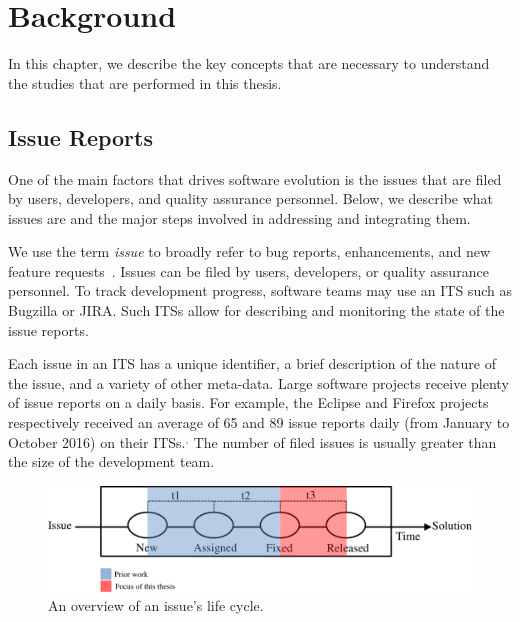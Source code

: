\chapter[Background]{Background} \label{ch:background}

In this chapter, we describe the key concepts that are necessary to understand
the studies that are performed in this thesis.

\section{Issue Reports}

One of the main factors that drives software evolution is the issues that are
filed by users, developers, and quality assurance personnel. Below, we describe
what issues are and the major steps involved in addressing and integrating them.

We use the term {\em issue} to broadly refer to bug reports, enhancements, and
new feature requests~\cite{giuliano2008}.  Issues can be filed by users,
developers, or quality assurance personnel. To track development progress,
software teams may use an ITS such as
Bugzilla or
JIRA. Such ITSs allow
for describing and monitoring the state of the issue reports.

Each issue in an ITS has a unique identifier, a brief description of the nature
of the issue, and a variety of other meta-data. Large software projects receive
plenty of issue reports on a daily basis. For example, the Eclipse and Firefox
projects respectively received an average of 65 and 89 issue reports daily (from
January to October 2016) on their
ITSs.$^,$
The number of filed issues is usually greater than the size of the development
team. 

\begin{figure}[t]
	\centering
	\includegraphics[width=\textwidth,keepaspectratio]
	{chapters/chapter2/figures/issue_lifecycle.pdf}
	\caption{An overview of an issue's life cycle.}
	\label{fig:issue_lifecycle2}
\end{figure}

